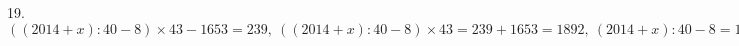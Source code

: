 19. $((2014+x):40-8)\times43-1653=239,\ ((2014+x):40-8)\times43=239+1653=1892,\ (2014+x):40-8=1892:43=44,\ (2014+x):40=44+8=52,\ 2014+x=52\cdot 40=2080,\
x=2080-2014=66.$\\
